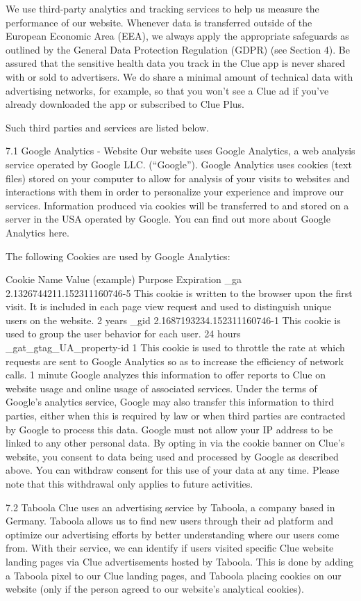 We use third-party analytics and tracking services to help us measure the performance of our website. Whenever data is transferred outside of the European Economic Area (EEA), we always apply the appropriate safeguards as outlined by the General Data Protection Regulation (GDPR) (see Section 4). Be assured that the sensitive health data you track in the Clue app is never shared with or sold to advertisers. We do share a minimal amount of technical data with advertising networks, for example, so that you won’t see a Clue ad if you’ve already downloaded the app or subscribed to Clue Plus.

Such third parties and services are listed below.

7.1 Google Analytics - Website
Our website uses Google Analytics, a web analysis service operated by Google LLC. (“Google”). Google Analytics uses cookies (text files) stored on your computer to allow for analysis of your visits to websites and interactions with them in order to personalize your experience and improve our services. Information produced via cookies will be transferred to and stored on a server in the USA operated by Google. You can find out more about Google Analytics here.

The following Cookies are used by Google Analytics:

Cookie Name	Value (example)	Purpose	Expiration
_ga	2.1326744211.152311160746-5	This cookie is written to the browser upon the first visit. It is included in each page view request and used to distinguish unique users on the website.	2 years
_gid	2.1687193234.152311160746-1	This cookie is used to group the user behavior for each user.	24 hours
_gat_gtag_UA_property-id	1	This cookie is used to throttle the rate at which requests are sent to Google Analytics so as to increase the efficiency of network calls.	1 minute
Google analyzes this information to offer reports to Clue on website usage and online usage of associated services. Under the terms of Google's analytics service, Google may also transfer this information to third parties, either when this is required by law or when third parties are contracted by Google to process this data. Google must not allow your IP address to be linked to any other personal data. By opting in via the cookie banner on Clue's website, you consent to data being used and processed by Google as described above. You can withdraw consent for this use of your data at any time. Please note that this withdrawal only applies to future activities.

7.2 Taboola
Clue uses an advertising service by Taboola, a company based in Germany. Taboola allows us to find new users through their ad platform and optimize our advertising efforts by better understanding where our users come from. With their service, we can identify if users visited specific Clue website landing pages via Clue advertisements hosted by Taboola. This is done by adding a Taboola pixel to our Clue landing pages, and Taboola placing cookies on our website (only if the person agreed to our website’s analytical cookies).

